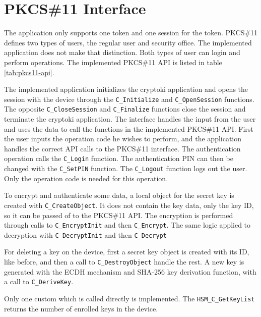 
\section{PKCS\#11 Interface}\label{chap:implementation:app:interface}

The application only supports one token and one session for the token.
PKCS\#11 defines two types of users, the regular user and security office. The implemented application does not make that distinction. Both types of user can login and perform operations.
The implemented PKCS\#11 API is listed in table \ref{tab:pkcs11-api}.

The implemented application initializes the cryptoki application and opens the session with the device through the \texttt{C\_Initialize} and \texttt{C\_OpenSession} functions.
The opposite \texttt{C\_CloseSession} and \texttt{C\_Finalize} functions close the session and terminate the cryptoki application.
The interface handles the input from the user and uses the data to call the functions in the implemented PKCS\#11 API.
First the user inputs the operation code he wishes to perform, and the application handles the correct API calls to the PKCS\#11 interface.
The authentication operation calls the \texttt{C\_Login} function. The authentication PIN can then be changed with the \texttt{C\_SetPIN} function.
The \texttt{C\_Logout} function logs out the user. Only the operation code is needed for this operation.

To encrypt and authenticate some data, a local object for the secret key is created with \texttt{C\_CreateObject}. It does not contain the key data, only the key ID, so it can be passed of to the PKCS\#11 API. The encryption is performed through calls to \texttt{C\_EncryptInit} and then \texttt{C\_Encrypt}.
The same logic applied to decryption with \texttt{C\_DecryptInit} and then \texttt{C\_Decrypt}

For deleting a key on the device, first a secret key object is created with its ID, like before, and then a call to \texttt{C\_DestroyObject} handle the rest.
A new key is generated with the ECDH mechanism and \ac{SHA}-256 key derivation function, with a call to \texttt{C\_DeriveKey}.

Only one custom which is called directly is implemented. The \texttt{HSM\_C\_GetKeyList} returns the number of enrolled keys in the device.

